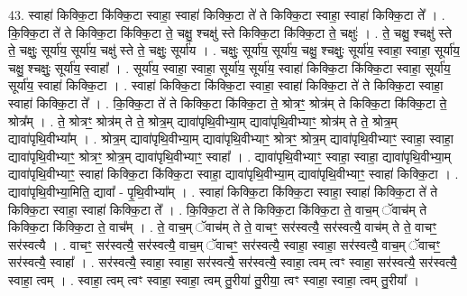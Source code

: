 \documentclass[17pt]{extarticle}
\begin{document}
43. स्वाहा॑ किक्कि॒टा कि॑क्कि॒टा स्वाहा॒ स्वाहा॑ किक्कि॒टा ते॑ ते किक्कि॒टा स्वाहा॒ स्वाहा॑ किक्कि॒टा ते᳚ । . कि॒क्कि॒टा ते॑ ते किक्कि॒टा कि॑क्कि॒टा ते॒ चक्षु॒ श्चक्षु॑ स्ते किक्कि॒टा कि॑क्कि॒टा ते॒ चक्षुः॑ । . ते॒ चक्षु॒ श्चक्षु॑ स्ते ते॒ चक्षुः॒ सूर्या॑य॒ सूर्या॑य॒ चक्षु॑ स्ते ते॒ चक्षुः॒ सूर्या॑य । . चक्षुः॒ सूर्या॑य॒ सूर्या॑य॒ चक्षु॒ श्चक्षुः॒ सूर्या॑य॒ स्वाहा॒ स्वाहा॒ सूर्या॑य॒ चक्षु॒ श्चक्षुः॒ सूर्या॑य॒ स्वाहा᳚ । . सूर्या॑य॒ स्वाहा॒ स्वाहा॒ सूर्या॑य॒ सूर्या॑य॒ स्वाहा॑ किक्कि॒टा कि॑क्कि॒टा स्वाहा॒ सूर्या॑य॒ सूर्या॑य॒ स्वाहा॑ किक्कि॒टा । . स्वाहा॑ किक्कि॒टा कि॑क्कि॒टा स्वाहा॒ स्वाहा॑ किक्कि॒टा ते॑ ते किक्कि॒टा स्वाहा॒ स्वाहा॑ किक्कि॒टा ते᳚ । . कि॒क्कि॒टा ते॑ ते किक्कि॒टा कि॑क्कि॒टा ते॒ श्रोत्रꣳ॒॒ श्रोत्र॑म् ते किक्कि॒टा कि॑क्कि॒टा ते॒ श्रोत्र᳚म् । . ते॒ श्रोत्रꣳ॒॒ श्रोत्र॑म् ते ते॒ श्रोत्र॒म् द्यावा॑पृथि॒वीभ्या॒म् द्यावा॑पृथि॒वीभ्याꣳ॒॒ श्रोत्र॑म् ते ते॒ श्रोत्र॒म् द्यावा॑पृथि॒वीभ्या᳚म् । . श्रोत्र॒म् द्यावा॑पृथि॒वीभ्या॒म् द्यावा॑पृथि॒वीभ्याꣳ॒॒ श्रोत्रꣳ॒॒ श्रोत्र॒म् द्यावा॑पृथि॒वीभ्याꣳ॒॒ स्वाहा॒ स्वाहा॒ द्यावा॑पृथि॒वीभ्याꣳ॒॒ श्रोत्रꣳ॒॒ श्रोत्र॒म् द्यावा॑पृथि॒वीभ्याꣳ॒॒ स्वाहा᳚ । . द्यावा॑पृथि॒वीभ्याꣳ॒॒ स्वाहा॒ स्वाहा॒ द्यावा॑पृथि॒वीभ्या॒म् द्यावा॑पृथि॒वीभ्याꣳ॒॒ स्वाहा॑ किक्कि॒टा कि॑क्कि॒टा स्वाहा॒ द्यावा॑पृथि॒वीभ्या॒म् द्यावा॑पृथि॒वीभ्याꣳ॒॒ स्वाहा॑ किक्कि॒टा । . द्यावा॑पृथि॒वीभ्या॒मिति॒ द्यावा᳚ - पृ॒थि॒वीभ्या᳚म् । . स्वाहा॑ किक्कि॒टा कि॑क्कि॒टा स्वाहा॒ स्वाहा॑ किक्कि॒टा ते॑ ते किक्कि॒टा स्वाहा॒ स्वाहा॑ किक्कि॒टा ते᳚ । . कि॒क्कि॒टा ते॑ ते किक्कि॒टा कि॑क्कि॒टा ते॒ वाच॒म् ॅवाच॑म् ते किक्कि॒टा कि॑क्कि॒टा ते॒ वाच᳚म् । . ते॒ वाच॒म् ॅवाच॑म् ते ते॒ वाचꣳ॒॒ सर॑स्वत्यै॒ सर॑स्वत्यै॒ वाच॑म् ते ते॒ वाचꣳ॒॒ सर॑स्वत्यै । . वाचꣳ॒॒ सर॑स्वत्यै॒ सर॑स्वत्यै॒ वाच॒म् ॅवाचꣳ॒॒ सर॑स्वत्यै॒ स्वाहा॒ स्वाहा॒ सर॑स्वत्यै॒ वाच॒म् ॅवाचꣳ॒॒ सर॑स्वत्यै॒ स्वाहा᳚ । . सर॑स्वत्यै॒ स्वाहा॒ स्वाहा॒ सर॑स्वत्यै॒ सर॑स्वत्यै॒ स्वाहा॒ त्वम् त्वꣳ स्वाहा॒ सर॑स्वत्यै॒ सर॑स्वत्यै॒ स्वाहा॒ त्वम् । . स्वाहा॒ त्वम् त्वꣳ स्वाहा॒ स्वाहा॒ त्वम् तु॒रीया॑ तु॒रीया॒ त्वꣳ स्वाहा॒ स्वाहा॒ त्वम् तु॒रीया᳚ । \newline
\pagebreak
{}
\end{document}
